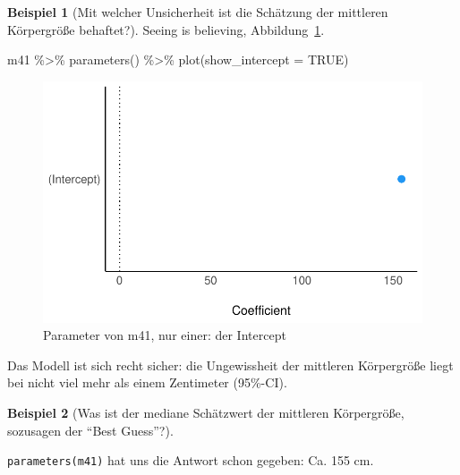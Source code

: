 \documentclass[
  a4paper,
  DIV=11]{scrreprt}
\newenvironment{Shaded}{\begin{snugshade}}{\end{snugshade}}
\newcommand{\AttributeTok}[1]{\textcolor[rgb]{0.40,0.45,0.13}{#1}}
\newcommand{\ConstantTok}[1]{\textcolor[rgb]{0.56,0.35,0.01}{#1}}
\newcommand{\FunctionTok}[1]{\textcolor[rgb]{0.28,0.35,0.67}{#1}}
\newcommand{\NormalTok}[1]{\textcolor[rgb]{0.00,0.23,0.31}{#1}}
\newcommand{\SpecialCharTok}[1]{\textcolor[rgb]{0.37,0.37,0.37}{#1}}
\theoremstyle{definition}
\newtheorem{example}{Beispiel}[chapter]
\theoremstyle{remark}
\begin{document}
\begin{example}[Mit welcher Unsicherheit ist die Schätzung der mittleren
Körpergröße behaftet?]
Seeing is believing, Abbildung~\ref{fig-m41-params-intercept}.

\begin{Shaded}
\begin{Highlighting}[]
\NormalTok{m41 }\SpecialCharTok{\%\textgreater{}\%} 
  \FunctionTok{parameters}\NormalTok{() }\SpecialCharTok{\%\textgreater{}\%} 
  \FunctionTok{plot}\NormalTok{(}\AttributeTok{show\_intercept =} \ConstantTok{TRUE}\NormalTok{)}
\end{Highlighting}
\end{Shaded}

\begin{figure}[H]

{\centering \includegraphics{./gauss_files/figure-pdf/fig-m41-params-intercept-1.pdf}

}

\caption{\label{fig-m41-params-intercept}Parameter von m41, nur einer:
der Intercept}

\end{figure}

Das Modell ist sich recht sicher: die Ungewissheit der mittleren
Körpergröße liegt bei nicht viel mehr als einem Zentimeter (95\%-CI).

\end{example}

\leavevmode{}%
\begin{example}[Was ist der mediane Schätzwert der mittleren
Körpergröße, sozusagen der ``Best Guess''?]\label{exm-kung6}

\texttt{parameters(m41)} hat uns die Antwort schon gegeben: Ca. 155 cm.

\end{example}
\end{document}
